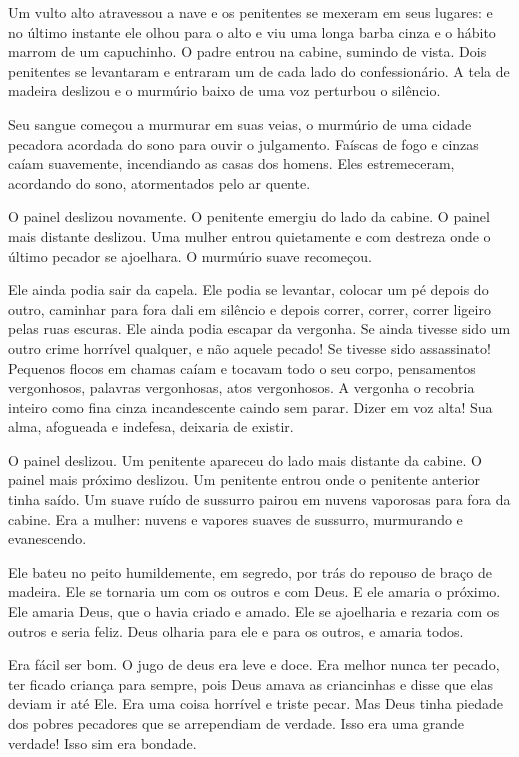 Um vulto alto atravessou a nave e os penitentes se mexeram em seus
lugares: e no último instante ele olhou para o alto e viu uma longa
barba cinza e o hábito marrom de um capuchinho. O padre entrou na
cabine, sumindo de vista. Dois penitentes se levantaram e entraram um
de cada lado do confessionário. A tela de madeira deslizou e o murmúrio
baixo de uma voz perturbou o silêncio.

Seu sangue começou a murmurar em suas veias, o murmúrio de uma cidade
pecadora acordada do sono para ouvir o julgamento. Faíscas de fogo e
cinzas caíam suavemente, incendiando as casas dos homens. Eles
estremeceram, acordando do sono, atormentados pelo ar quente.

O painel deslizou novamente. O penitente emergiu do lado da cabine. O
painel mais distante deslizou. Uma mulher entrou quietamente e com
destreza onde o último pecador se ajoelhara. O murmúrio suave
recomeçou.

Ele ainda podia sair da capela. Ele podia se levantar, colocar um pé
depois do outro, caminhar para fora dali em silêncio e depois correr,
correr, correr ligeiro pelas ruas escuras. Ele ainda podia escapar da
vergonha. Se ainda tivesse sido um outro crime horrível qualquer, e não
aquele pecado! Se tivesse sido assassinato! Pequenos flocos em chamas
caíam e tocavam todo o seu corpo, pensamentos vergonhosos, palavras
vergonhosas, atos vergonhosos. A vergonha o recobria inteiro como fina
cinza incandescente caindo sem parar. Dizer em voz alta! Sua alma,
afogueada e indefesa, deixaria de existir.

O painel deslizou. Um penitente apareceu do lado mais distante da
cabine. O painel mais próximo deslizou. Um penitente entrou onde o
penitente anterior tinha saído. Um suave ruído de sussurro pairou em
nuvens vaporosas para fora da cabine. Era a mulher: nuvens e vapores
suaves de sussurro, murmurando e evanescendo.

Ele bateu no peito humildemente, em segredo, por trás do repouso de braço de
madeira. Ele se tornaria um com os outros e com Deus. E ele amaria o
próximo. Ele amaria Deus, que o havia criado e amado. Ele se ajoelharia
e rezaria com os outros e seria feliz. Deus olharia para ele e para os
outros, e amaria todos.

Era fácil ser bom. O jugo de deus era leve e doce. Era melhor nunca ter
pecado, ter ficado criança para sempre, pois Deus amava as criancinhas
e disse que elas deviam ir até Ele. Era uma coisa horrível e triste
pecar. Mas Deus tinha piedade dos pobres pecadores que se arrependiam
de verdade. Isso era uma grande verdade! Isso sim era bondade.

